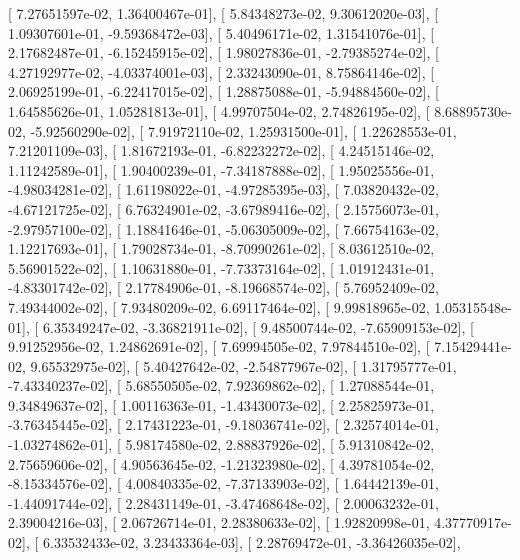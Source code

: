 \documentclass{article}
\begin{document}
       [  7.27651597e-02,   1.36400467e-01],
       [  5.84348273e-02,   9.30612020e-03],
       [  1.09307601e-01,  -9.59368472e-03],
       [  5.40496171e-02,   1.31541076e-01],
       [  2.17682487e-01,  -6.15245915e-02],
       [  1.98027836e-01,  -2.79385274e-02],
       [  4.27192977e-02,  -4.03374001e-03],
       [  2.33243090e-01,   8.75864146e-02],
       [  2.06925199e-01,  -6.22417015e-02],
       [  1.28875088e-01,  -5.94884560e-02],
       [  1.64585626e-01,   1.05281813e-01],
       [  4.99707504e-02,   2.74826195e-02],
       [  8.68895730e-02,  -5.92560290e-02],
       [  7.91972110e-02,   1.25931500e-01],
       [  1.22628553e-01,   7.21201109e-03],
       [  1.81672193e-01,  -6.82232272e-02],
       [  4.24515146e-02,   1.11242589e-01],
       [  1.90400239e-01,  -7.34187888e-02],
       [  1.95025556e-01,  -4.98034281e-02],
       [  1.61198022e-01,  -4.97285395e-03],
       [  7.03820432e-02,  -4.67121725e-02],
       [  6.76324901e-02,  -3.67989416e-02],
       [  2.15756073e-01,  -2.97957100e-02],
       [  1.18841646e-01,  -5.06305009e-02],
       [  7.66754163e-02,   1.12217693e-01],
       [  1.79028734e-01,  -8.70990261e-02],
       [  8.03612510e-02,   5.56901522e-02],
       [  1.10631880e-01,  -7.73373164e-02],
       [  1.01912431e-01,  -4.83301742e-02],
       [  2.17784906e-01,  -8.19668574e-02],
       [  5.76952409e-02,   7.49344002e-02],
       [  7.93480209e-02,   6.69117464e-02],
       [  9.99818965e-02,   1.05315548e-01],
       [  6.35349247e-02,  -3.36821911e-02],
       [  9.48500744e-02,  -7.65909153e-02],
       [  9.91252956e-02,   1.24862691e-02],
       [  7.69994505e-02,   7.97844510e-02],
       [  7.15429441e-02,   9.65532975e-02],
       [  5.40427642e-02,  -2.54877967e-02],
       [  1.31795777e-01,  -7.43340237e-02],
       [  5.68550505e-02,   7.92369862e-02],
       [  1.27088544e-01,   9.34849637e-02],
       [  1.00116363e-01,  -1.43430073e-02],
       [  2.25825973e-01,  -3.76345445e-02],
       [  2.17431223e-01,  -9.18036741e-02],
       [  2.32574014e-01,  -1.03274862e-01],
       [  5.98174580e-02,   2.88837926e-02],
       [  5.91310842e-02,   2.75659606e-02],
       [  4.90563645e-02,  -1.21323980e-02],
       [  4.39781054e-02,  -8.15334576e-02],
       [  4.00840335e-02,  -7.37133903e-02],
       [  1.64442139e-01,  -1.44091744e-02],
       [  2.28431149e-01,  -3.47468648e-02],
       [  2.00063232e-01,   2.39004216e-03],
       [  2.06726714e-01,   2.28380633e-02],
       [  1.92820998e-01,   4.37770917e-02],
       [  6.33532433e-02,   3.23433364e-03],
       [  2.28769472e-01,  -3.36426035e-02],
\end{document}
